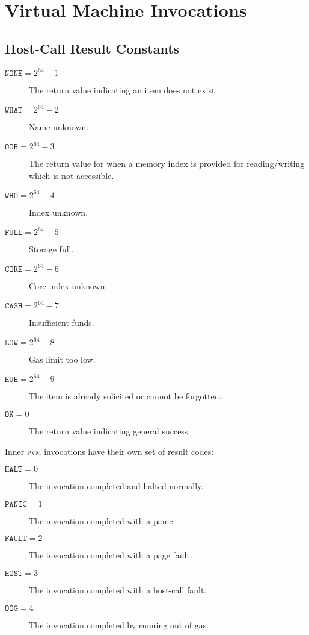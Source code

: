 \section{Virtual Machine Invocations}\label{sec:virtualmachineinvocations}



\newcommand*{\pvm}{\mathbf{M}}
\newcommand*{\segoff}{\varsigma}

\subsection{Host-Call Result Constants}

\begin{description}
  \item[$\mathtt{NONE} = 2^{64} - 1$] The return value indicating an item does not exist.
  \item[$\mathtt{WHAT} = 2^{64} - 2$] Name unknown.
  \item[$\mathtt{OOB} = 2^{64} - 3$] The return value for when a memory index is provided for reading/writing which is not accessible.
  \item[$\mathtt{WHO} = 2^{64} - 4$] Index unknown.
  \item[$\mathtt{FULL} = 2^{64} - 5$] Storage full.
  \item[$\mathtt{CORE} = 2^{64} - 6$] Core index unknown.
  \item[$\mathtt{CASH} = 2^{64} - 7$] Insufficient funds.
  \item[$\mathtt{LOW} = 2^{64} - 8$] Gas limit too low.
  \item[$\mathtt{HUH} = 2^{64} - 9$] The item is already solicited or cannot be forgotten.
  \item[$\mathtt{OK} = 0$] The return value indicating general success.
\end{description}

Inner \textsc{pvm} invocations have their own set of result codes:
\begin{description}
  \item[$\mathtt{HALT} = 0$] The invocation completed and halted normally.
  \item[$\mathtt{PANIC} = 1$] The invocation completed with a panic.
  \item[$\mathtt{FAULT} = 2$] The invocation completed with a page fault.
  \item[$\mathtt{HOST} = 3$] The invocation completed with a host-call fault.
  \item[$\mathtt{OOG} = 4$] The invocation completed by running out of gas.
\end{description}

